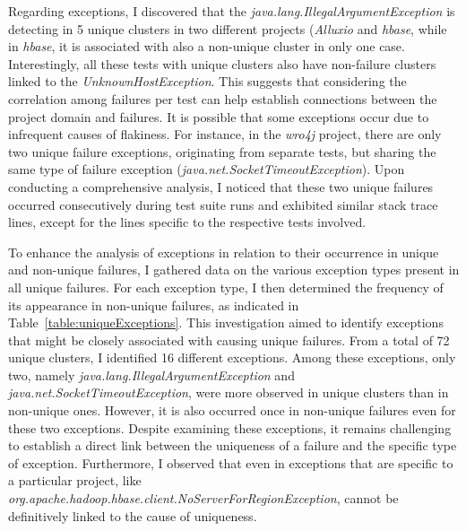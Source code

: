 Regarding exceptions, I discovered that the \emph{java.lang.IllegalArgumentException} is detecting in 5 unique clusters in two different projects (\emph{Alluxio} and \emph{hbase}, while in \emph{hbase}, it is associated with also a non-unique cluster in only one case. Interestingly, all these tests with unique clusters also have non-failure clusters linked to the \emph{UnknownHostException}. This suggests that considering the correlation among failures per test can help establish connections between the project domain and failures. It is possible that some exceptions occur due to infrequent causes of flakiness. For instance, in the \emph{wro4j} project, there are only two unique failure exceptions, originating from separate tests, but sharing the same type of failure exception (\emph{java.net.SocketTimeoutException}). Upon conducting a comprehensive analysis, I noticed that these two unique failures occurred consecutively during test suite runs and exhibited similar stack trace lines, except for the lines specific to the respective tests involved. 

To enhance the analysis of exceptions in relation to their occurrence in unique and non-unique failures, I gathered data on the various exception types present in all unique failures. For each exception type, I then determined the frequency of its appearance in non-unique failures, as indicated in Table~\ref{table:uniqueExceptions}. This investigation aimed to identify exceptions that might be closely associated with causing unique failures.
From a total of 72 unique clusters, I identified 16 different exceptions. Among these exceptions, only two, namely \emph{java.lang.IllegalArgumentException} and \emph{java.net.SocketTimeoutException}, were more observed in unique clusters than in non-unique ones. However, it is also occurred once in non-unique failures even for these two exceptions. 
Despite examining these exceptions, it remains challenging to establish a direct link between the uniqueness of a failure and the specific type of exception. Furthermore, I observed that even in exceptions that are specific to a particular project, like \emph{org.apache.hadoop.hbase.client.NoServerForRegionException}, cannot be definitively linked to the cause of uniqueness.  
 

